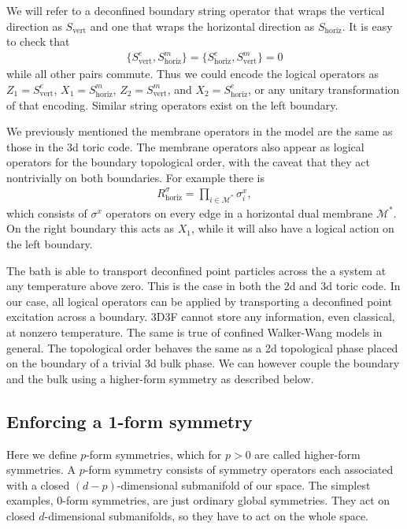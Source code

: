 \documentclass[twocolumn, longbibliography]{revtex4-2}
\renewcommand{\vert}{\text{vert}}
\newcommand{\horiz}{\text{horiz}}
\begin{document}
We will refer to a deconfined boundary string operator that wraps the vertical direction as $S_\vert$ and one that wraps the horizontal direction as $S_\horiz$. It is easy to check that 
\begin{align}
\{S^e_\vert,S^m_\horiz\}=\{S^e_\horiz,S^m_\vert\}=0
\end{align}
while all other pairs commute. Thus we could encode the logical operators as $Z_1=S^e_\vert$, $X_1 = S^m_\horiz$, $Z_2 = S^m_\vert$, and $X_2 = S^e_\horiz$, or any unitary transformation of that encoding. Similar string operators exist on the left boundary.

We previously mentioned the membrane operators in the model are the same as those in the 3d toric code. The membrane operators also appear as logical operators for the boundary topological order, with the caveat that they act nontrivially on both boundaries. For example there is 
\begin{align}
R^\sigma_\horiz = \prod_{i\in \mathcal{M}^*} \sigma^x_i,
\end{align}
which consists of $\sigma^x$ operators on every edge in a horizontal dual membrane $\mathcal{M}^*$. On the right boundary this acts as $X_1$, while it will also have a logical action on the left boundary.

The bath is able to transport deconfined point particles across the a system at any temperature above zero. This is the case in both the 2d and 3d toric code. In our case, all logical operators can be applied by transporting a deconfined point excitation across a boundary. 3D3F cannot store any information, even classical, at nonzero temperature. The same is true of confined Walker-Wang models in general. The topological order behaves the same as a 2d topological phase placed on the boundary of a trivial 3d bulk phase. We can however couple the boundary and the bulk using a higher-form symmetry as described below.

\subsection{Enforcing a 1-form symmetry} \label{sub:1form}

Here we define $p$-form symmetries, which for $p>0$ are called higher-form symmetries. A $p$-form symmetry consists of symmetry operators each associated with a closed $(d-p)$-dimensional submanifold of our space. The simplest examples, 0-form symmetries, are just ordinary global symmetries. They act on closed $d$-dimensional submanifolds, so they have to act on the whole space.
	
\end{document}
